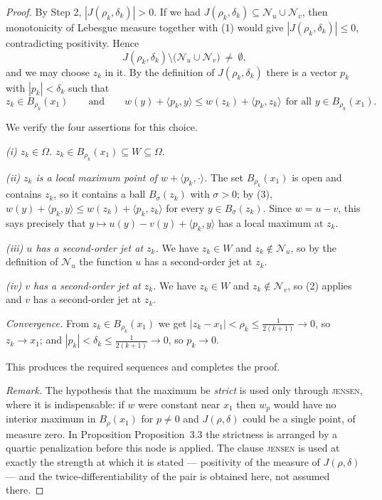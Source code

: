 \begin{proof}
By Step 2, $|J(\rho_k,\delta_k)|>0$. If we had
$J(\rho_k,\delta_k)\subseteq\mathcal N_u\cup\mathcal N_v$, then monotonicity of Lebesgue
measure together with (1) would give $|J(\rho_k,\delta_k)|\le0$, contradicting positivity.
Hence
\[
 J(\rho_k,\delta_k)\setminus\big(\mathcal N_u\cup\mathcal N_v\big)\ \ne\ \emptyset ,
\]
and we may choose $z_k$ in it. By the definition of $J(\rho_k,\delta_k)$ there is a vector
$p_k$ with $|p_k|<\delta_k$ such that
\[
 z_k\in B_{\rho_k}(x_1)
 \qquad\text{and}\qquad
 w(y)+\langle p_k,y\rangle\le w(z_k)+\langle p_k,z_k\rangle\ \ \text{for all }y\in B_{\rho_k}(x_1). \tag{3}
\]

We verify the four assertions for this choice.

\emph{(i) $z_k\in\Omega$.} $z_k\in B_{\rho_k}(x_1)\subseteq W\subseteq\Omega$.

\emph{(ii) $z_k$ is a local maximum point of $w+\langle p_k,\cdot\rangle$.} The set
$B_{\rho_k}(x_1)$ is open and contains $z_k$, so it contains a ball $B_\sigma(z_k)$ with
$\sigma>0$; by (3), $w(y)+\langle p_k,y\rangle\le w(z_k)+\langle p_k,z_k\rangle$ for every
$y\in B_\sigma(z_k)$. Since $w=u-v$, this says precisely that
$y\mapsto u(y)-v(y)+\langle p_k,y\rangle$ has a local maximum at $z_k$.

\emph{(iii) $u$ has a second-order jet at $z_k$.} We have $z_k\in W$ and
$z_k\notin\mathcal N_u$, so by the definition of $\mathcal N_u$ the function $u$ has a
second-order jet at $z_k$.

\emph{(iv) $v$ has a second-order jet at $z_k$.} We have $z_k\in W$ and
$z_k\notin\mathcal N_v$, so (2) applies and $v$ has a second-order jet at $z_k$.

\emph{Convergence.} From $z_k\in B_{\rho_k}(x_1)$ we get
$|z_k-x_1|<\rho_k\le\tfrac1{2(k+1)}\to0$, so $z_k\to x_1$; and
$|p_k|<\delta_k\le\tfrac1{2(k+1)}\to0$, so $p_k\to0$.

This produces the required sequences and completes the proof.

\medskip\noindent\emph{Remark.} The hypothesis that the maximum be \emph{strict} is used only
through \textsc{jensen}, where it is indispensable: if $w$ were constant near $x_1$ then
$w_p$ would have no interior maximum in $B_\rho(x_1)$ for $p\ne0$ and
$J(\rho,\delta)$ could be a single point, of measure zero. In Proposition Proposition~3.3 the
strictness is arranged by a quartic penalization before this node is applied. The clause
\textsc{jensen} is used at exactly the strength at which it is stated --- positivity of the
measure of $J(\rho,\delta)$ --- and the twice-differentiability of the pair is obtained here,
not assumed there.
\end{proof}

